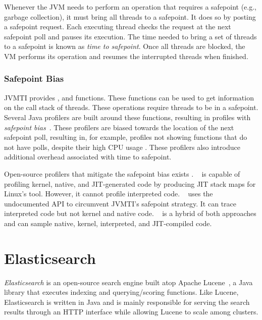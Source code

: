 Whenever the JVM needs to perform an operation that requires a safepoint (e.g., garbage collection), it must bring all threads to a safepoint. It does so by posting a safepoint request. Each executing thread checks the request at the next safepoint poll and pauses its execution. The time needed to bring a set of threads to a safepoint is known as \emph{time to safepoint}. Once all threads are blocked, the VM performs its operation and resumes the interrupted threads when finished.

\subsubsection*{Safepoint Bias}

JVMTI provides ,  and  functions. These functions can be used to get information on the call stack of threads. These operations require threads to be in a safepoint. Several Java profilers are built around these functions, resulting in profiles with \emph{safepoint bias}~\cite{mytkowicz2010evaluating}. These profilers are biased towards the location of the next safepoint poll, resulting in, for example, profiles not showing functions that do not have polls, despite their high CPU usage \cite{wakart2016terrible}. These profilers also introduce additional overhead associated with time to safepoint.

Open-source profilers that mitigate the safepoint bias exists \cite{nisbet2019profiling}. ~\cite{perfmapagent} is capable of profiling kernel, native, and JIT-generated code by producing JIT stack maps for Linux's  tool. However, it cannot profile interpreted code. ~\cite{honestprofiler} uses the  undocumented API to circumvent JVMTI's safepoint strategy. It can trace interpreted code but not kernel and native code. ~\cite{asyncprofiler} is a hybrid of both approaches and can sample native, kernel, interpreted, and JIT-compiled code.

\section{Elasticsearch}

\emph{Elasticsearch} is an open-source search engine built atop Apache Lucene~\cite{bialecki2012lucene}, a Java library that executes indexing and querying/scoring functions. Like Lucene, Elasticsearch is written in Java and is mainly responsible for serving the search results through an HTTP interface while allowing Lucene to scale among clusters.

